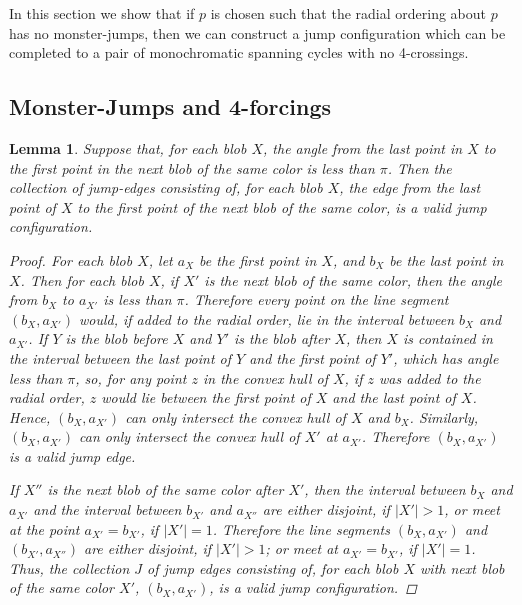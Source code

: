 \documentclass[12pt]{article}
\newtheorem{lemma}{Lemma}
\theoremstyle{definition}
\begin{document}
In this section we show that if $p$ is chosen such that the radial ordering about $p$ has no monster-jumps, then we can construct a jump configuration which can be completed to a pair of monochromatic spanning cycles with no 4-crossings. 

\subsection{Monster-Jumps and 4-forcings}
\begin{lemma}
  \label{lem:jump-config-exists}
  Suppose that, for each blob $X$, the angle from the last point in $X$ to the first point in the next blob of the same color is less than $\pi$. Then the collection of jump-edges consisting of, for each blob $X$, the edge from the last point of $X$ to the first point of the next blob of the same color, is a valid jump configuration.
  \begin{proof}
    For each blob $X$, let $a_X$ be the first point in $X$, and $b_X$ be the last point in $X$.
    Then for each blob $X$, if $X'$ is the next blob of the same color, then the angle from $b_X$ to $a_{X'}$ is less than $\pi$.
    Therefore every point on the line segment $(b_X,a_{X'})$ would, if added to the radial order, lie in the interval between $b_X$ and $a_{X'}$.
    If $Y$ is the blob before $X$ and $Y'$ is the blob after $X$, then $X$ is contained in the interval between the last point of $Y$ and the first point of $Y'$, which has angle less than $\pi$, so, for any point $z$ in the convex hull of $X$, if $z$ was added to the radial order, $z$ would lie between the first point of $X$ and the last point of $X$.
    Hence, $(b_X,a_{X'})$ can only intersect the convex hull of $X$ and $b_X$.
    Similarly, $(b_X,a_{X'})$ can only intersect the convex hull of $X'$ at $a_{X'}$.
    Therefore $(b_X,a_{X'})$ is a valid jump edge.

    If $X''$ is the next blob of the same color after $X'$, then the interval between $b_X$ and $a_{X'}$ and the interval between $b_{X'}$ and $a_{X''}$ are either disjoint, if $|X'|>1$, or meet at the point $a_{X'}=b_{X'}$, if $|X'|=1$.
    Therefore the line segments $(b_{X},a_{X'})$ and $(b_{X'},a_{X''})$ are either disjoint, if $|X'|>1$; or meet at $a_{X'}=b_{X'}$, if $|X'|=1$.
    Thus, the collection $J$ of jump edges consisting of, for each blob $X$ with next blob of the same color $X'$, $(b_X,a_{X'})$, is a valid jump configuration.
  \end{proof}
\end{lemma}
\end{document}
